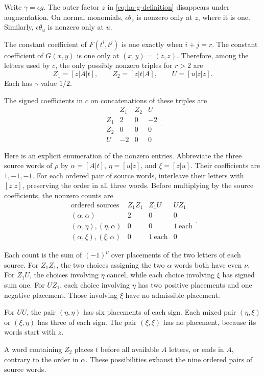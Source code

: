 Write $\gamma=\epsilon g$. The outer factor $z$ in
\eqref{eq:ha-g-definition} disappears under augmentation.
On normal monomials, $\epsilon\theta_z$ is nonzero only at $z$,
where it is one. Similarly, $\epsilon\theta_u$ is nonzero only at $u$.

The constant coefficient of $F(t^i,t^j)$ is one exactly when
$i+j=r$. The constant coefficient of $G(x,y)$ is one only at
$(x,y)=(z,z)$. Therefore, among the letters used by $c$, the only
possibly nonzero triples for $r>2$ are
\[
 Z_1=[z|A|t],\qquad Z_2=[z|t|A],\qquad U=[u|z|z].
\]
Each has $\gamma$-value $1/2$.

The signed coefficients in $c$ on concatenations of these triples
are
\[
 \begin{array}{c|rrr}
       &Z_1&Z_2&U\\\hline
 Z_1&2&0&-2\\
 Z_2&0&0&0\\
 U&-2&0&0
 \end{array}.
\]

Here is an explicit enumeration of the nonzero entries.
Abbreviate the three source words of $\rho$ by
$\alpha=[A|t]$, $\eta=[u|z]$, and $\xi=[z|u]$.
Their coefficients are $1,-1,-1$.
For each ordered pair of source words, interleave their letters with
$[z|z]$, preserving the order in all three words.
Before multiplying by the source coefficients, the nonzero counts are
\[
 \begin{array}{c|rrr}
 \text{ordered sources}&Z_1Z_1&Z_1U&UZ_1\\\hline
 (\alpha,\alpha)&2&0&0\\
 (\alpha,\eta),(\eta,\alpha)&0&0&1\ \text{each}\\
 (\alpha,\xi),(\xi,\alpha)&0&1\ \text{each}&0
 \end{array}.
\]

Each count is the sum of $(-1)^\nu$ over placements of the two
letters of each source. For $Z_1Z_1$, the two choices assigning the
two $\alpha$ words both have even $\nu$.
For $Z_1U$, the choices involving $\eta$ cancel, while each choice
involving $\xi$ has signed sum one.
For $UZ_1$, each choice involving $\eta$ has two positive placements
and one negative placement. Those involving $\xi$ have no admissible placement.

For $UU$, the pair $(\eta,\eta)$ has six placements of each sign.
Each mixed pair $(\eta,\xi)$ or $(\xi,\eta)$ has three of each sign.
The pair $(\xi,\xi)$ has no placement, because its words start with $z$.

A word containing $Z_2$ places $t$ before all available $A$ letters,
or ends in $A$, contrary to the order in $\alpha$.
These possibilities exhaust the nine ordered pairs of source words.

